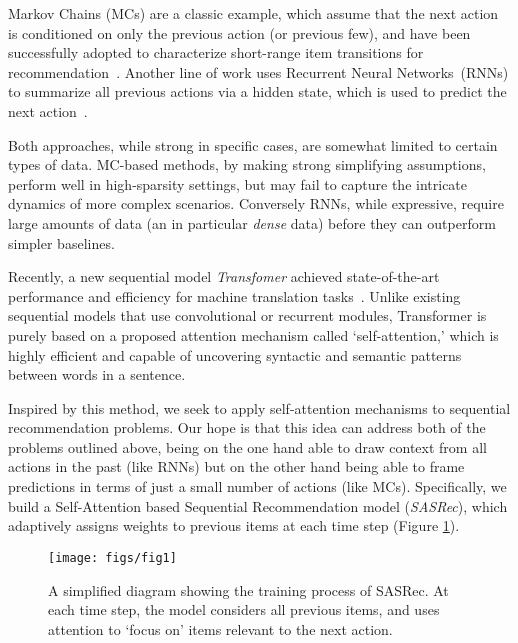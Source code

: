 \documentclass[conference]{IEEEtran}
\begin{document}
Markov Chains (MCs) are a classic example, 
which assume that the next action is conditioned on only the previous action (or previous few),
and have been successfully adopted to
characterize short-range item transitions for recommendation~\cite{rendle2010fpmc}. Another line of work uses Recurrent Neural Networks~(RNNs) to summarize all previous 
actions via
a hidden state, 
which is used to
predict the next action~\cite{DBLP:journals/corr/HidasiKBT15}.

Both approaches, while strong in specific cases, are somewhat limited to certain types of data. MC-based methods, by making strong simplifying assumptions, perform well in high-sparsity settings, but may fail to capture the intricate dynamics of more complex scenarios. Conversely RNNs, while expressive, require large amounts of data (an in particular \emph{dense} data) before they can outperform simpler baselines.


Recently, a new sequential model \emph{Transfomer} achieved state-of-the-art performance and efficiency for machine translation tasks~\cite{transform}. Unlike existing sequential models that use convolutional or recurrent modules, Transformer is purely based on a proposed attention mechanism called `self-attention,' which is highly efficient and capable of uncovering 
syntactic and semantic patterns between words in a sentence. 

Inspired by this method, we seek to apply self-attention mechanisms to sequential recommendation problems.
Our hope is that this idea can address both of the problems outlined above, being on the one hand able to draw context from all actions 
in the past (like RNNs) but on the other hand being able to frame predictions in terms of just a small number of actions (like MCs).
Specifically,
we build a Self-Attention based Sequential Recommendation model (\emph{SASRec}), which adaptively assigns weights to previous items at each time step (Figure \ref{fig:diagram}). 

\begin{figure}[t]
\centering
\texttt{[image: figs/fig1]}
\caption{A simplified diagram showing the training process of SASRec. At each time step, the model considers all previous items, and 
uses attention to `focus on' items relevant to the
next action.}
\label{fig:diagram}
\end{figure}
\end{document}
